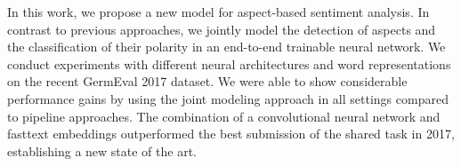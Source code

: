 In this work, we propose a new model for aspect-based sentiment analysis. In contrast to previous approaches, we jointly model the detection of aspects and the classification of their polarity in an end-to-end trainable neural network. We conduct experiments with different neural architectures and word representations on the recent GermEval 2017 dataset. We were able to show considerable performance gains by using the joint modeling approach in all settings compared to pipeline approaches. The combination of a convolutional neural network and fasttext embeddings outperformed the best submission of the shared task in 2017, establishing a new state of the art.
